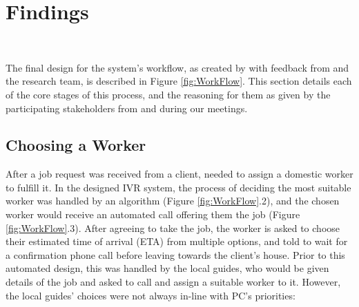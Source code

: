 \section{Findings}

\begin{figure*}
  \centering
  
  \caption{The designed workflow for a \PC{} order. The client requests a worker through the smartphone app (1). \PC{}'s algorithm chooses a suitable worker (2) and rings them to see if they will take the order (3). If so, the client is called by customer support, to ensure the order is genuine (4). If it is, the worker receives a confirmation call from the system (5) and is asked to give an ETA and leave towards the client's house. During the journey, the worker is called up three times to get an updated ETA (6). Upon arrival, the worker calls the system to log the work as having started (7) and completes the job (8). After finishing, the worker calls into the system to log the work as finished (9). At any time, the worker can call the system to get information about a current job or their wages, get help from the \PC{} office or emergency services, or to contact the client (X). }~\label{fig:WorkFlow}
\end{figure*}

The final design for the system's workflow, as created by \PCTwo{} with feedback from \NGOOne{} and the research team, is described in Figure \ref{fig:WorkFlow}. This section details each of the core stages of this process, and the reasoning for them as given by the participating stakeholders from \PC{} and \NGO{} during our meetings.

\subsection{Choosing a Worker}

After a job request was received from a client, \PC{} needed to assign a domestic worker to fulfill it. In the designed IVR system, the process of deciding the most suitable worker was handled by an algorithm (Figure \ref{fig:WorkFlow}.2), and the chosen worker would receive an automated call offering them the job (Figure \ref{fig:WorkFlow}.3). After agreeing to take the job, the worker is asked to choose their estimated time of arrival (ETA) from multiple options, and told to wait for a confirmation phone call before leaving towards the client's house. Prior to this automated design, this was handled by the local guides, who would be given details of the job and asked to call and assign a suitable worker to it. However, the local guides' choices were not always in-line with PC's priorities:

